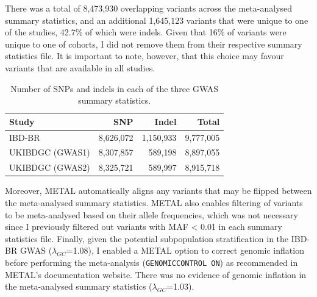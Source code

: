 There was a total of 8,473,930 overlapping variants across the meta-analysed summary statistics, and an additional 1,645,123 variants that were unique to one of the studies, 42.7\% of which were indels. Given that 16\% of variants were unique to one of cohorts, I did not remove them from their respective summary statistics file. It is important to note, however, that this choice may favour variants that are available in all studies. 

\begin{table}[H]
  \caption[Number of SNPs and indels in each of the three GWAS summary statistics]{Number of SNPs and indels in each of the three GWAS summary statistics.}
  \centering
  \begin{tabular}[t]{lrrr}
  \toprule
  \textbf{Study} & \textbf{SNP} & \textbf{Indel} & \textbf{Total}\\
  \midrule
  IBD-BR & 8,626,072 & 1,150,933 & 9,777,005\\
  UKIBDGC (GWAS1) & 8,307,857 & 589,198 & 8,897,055\\
  UKIBDGC (GWAS2) & 8,325,721 & 589,997 & 8,915,718\\
  \bottomrule
  \end{tabular}
  \end{table}

Moreover, METAL automatically aligns any variants that may be flipped between the meta-analysed summary statistics. METAL also enables filtering of variants to be meta-analysed based on their allele frequencies, which was not necessary since I previously filtered out variants with MAF < 0.01 in each summary statistics file. Finally, given the potential subpopulation stratification in the IBD-BR GWAS ($\lambda_{GC}$=1.08), I enabled a METAL option to correct genomic inflation before performing the meta-analysis (\Verb+GENOMICCONTROL ON+) as recommended in METAL's documentation website. There was no evidence of genomic inflation in the meta-analysed summary statistics ($\lambda_{GC}$=1.03).\\

